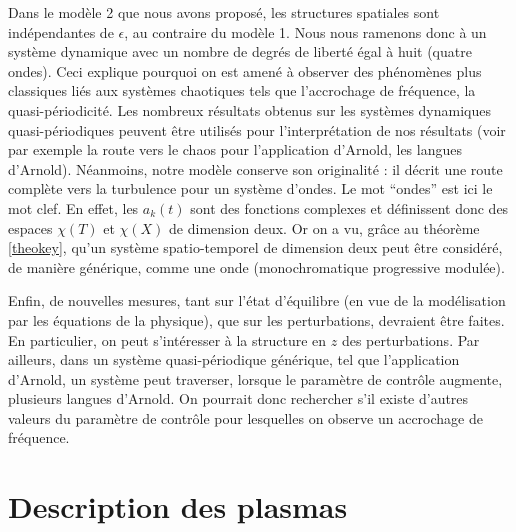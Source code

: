\documentclass{book}
\begin{document}
Dans le mod\`ele 2 que nous avons propos\'e, les structures spatiales
sont ind\'ependantes de $\epsilon$, au contraire du mod\`ele 1. Nous
nous ramenons donc \`a un syst\`eme dynamique avec un nombre de
degr\'es de libert\'e \'egal \`a huit (quatre ondes). Ceci  explique
pourquoi on est amen\'e \`a observer des ph\'enom\`enes plus
classiques li\'es aux syst\`emes chaotiques tels que l'accrochage de
fr\'equence, la quasi-p\'eriodicit\'e. Les nombreux r\'esultats obtenus
sur les syst\`emes dynamiques quasi-p\'eriodiques peuvent \^etre 
utilis\'es pour l'interpr\'etation de nos r\'esultats (voir par
exemple la route vers le chaos pour l'application 
d'Arnold, les langues d'Arnold). N\'eanmoins, notre mod\`ele conserve
son originalit\'e : il d\'ecrit une route compl\`ete vers la
turbulence pour un syst\`eme d'ondes. Le mot ``ondes'' est ici le mot
clef. 
En effet, les $a_k(t)$ sont des fonctions complexes et d\'efinissent
donc des espaces $\chi(T)$ et $\chi(X)$ de dimension
deux. Or on a vu, gr\^ace au th\'eor\`eme \ref{theokey}, qu'un
syst\`eme spatio-temporel de dimension deux peut \^etre consid\'er\'e,
de mani\`ere g\'en\'erique, comme une onde (monochromatique
progressive modul\'ee). 



Enfin, de nouvelles mesures, tant sur l'\'etat
d'\'equilibre (en vue de la mod\'elisation par les \'equations de la
physique), que sur les perturbations, devraient \^etre faites. En
particulier, on peut 
s'int\'eresser \`a la structure en $z$ des perturbations.  
Par ailleurs, dans un syst\`eme quasi-p\'eriodique g\'en\'erique, tel que
l'application d'Arnold, un syst\`eme peut traverser, lorsque le
param\`etre de contr\^ole augmente, plusieurs langues d'Arnold.
On pourrait donc rechercher s'il existe d'autres valeurs du param\`etre
de contr\^ole pour lesquelles on observe un accrochage de fr\'equence.



\appendix

\chapter{Description des plasmas}\label{chapdescplasma}
\end{document}
